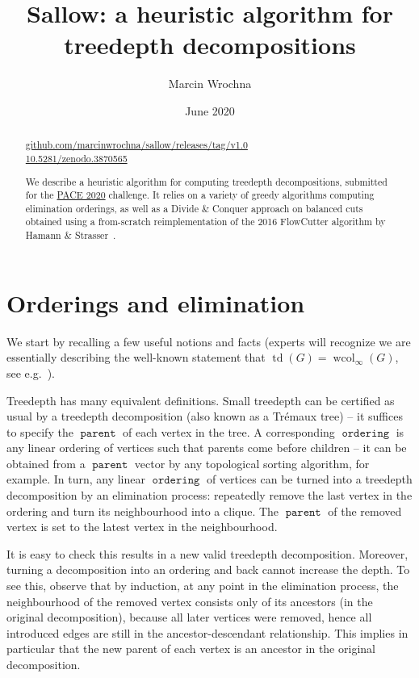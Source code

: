 \documentclass{timgad}
\title{Sallow: a heuristic algorithm for treedepth decompositions}
\author{Marcin Wrochna}
\affil{University of Oxford}
\date{June 2020}
\DeclareMathOperator{\td}{td}
\DeclareMathOperator{\wcol}{wcol}
\DeclareMathOperator{\parent}{\texttt{parent}}
\DeclareMathOperator{\ordering}{\texttt{ordering}}
\begin{document}
\maketitle

\begin{abstract}
	\noindent
	\href{https://github.com/marcinwrochna/sallow/releases/tag/v1.0}{github.com/marcinwrochna/sallow/releases/tag/v1.0}\\
	\href{http://doi.org/10.5281/zenodo.3870565}{10.5281/zenodo.3870565}	
	
	\medskip
	We describe a heuristic algorithm for computing treedepth decompositions, submitted for the \href{https://pacechallenge.org/2020}{PACE 2020} challenge. It relies on a variety of greedy algorithms computing elimination orderings, as well as a Divide \& Conquer approach on balanced cuts obtained using a from-scratch reimplementation of the 2016 FlowCutter algorithm by Hamann \& Strasser~\cite{HamannS18}.
\end{abstract}


\section{Orderings and elimination}
We start by recalling a few useful notions and facts (experts will recognize we are essentially describing the well-known statement that $\td(G) = \wcol_\infty(G)$, see e.g.~\cite[Lemma 6.5]{sparsityTreedepth}).

Treedepth has many equivalent definitions.
Small treedepth can be certified as usual by a treedepth decomposition (also known as a Trémaux tree) -- it suffices to specify the $\parent$ of each vertex in the tree.
A corresponding $\ordering$ is any linear ordering of vertices such that parents come before children -- it can be obtained from a $\parent$ vector by any topological sorting algorithm, for example.
In turn, any linear $\ordering$ of vertices can be turned into a treedepth decomposition by an elimination process:
repeatedly remove the last vertex in the ordering and turn its neighbourhood into a clique.
The $\parent$ of the removed vertex is set to the latest vertex in the neighbourhood.

It is easy to check this results in a new valid treedepth decomposition.
Moreover, turning a decomposition into an ordering and back cannot increase the depth.
To see this, observe that by induction, at any point in the elimination process,
the neighbourhood of the removed vertex consists only of its ancestors (in the original decomposition),
because all later vertices were removed,
hence all introduced edges are still in the ancestor-descendant relationship.
This implies in particular that the new parent of each vertex is an ancestor in the original decomposition.
\end{document}
